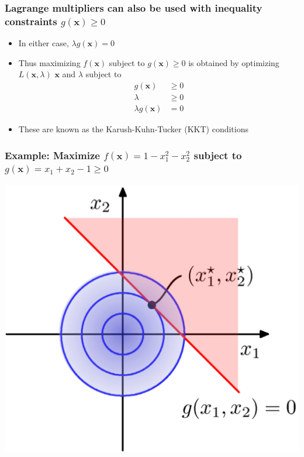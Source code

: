 \documentclass[12pt,notes,mathserif]{beamer}
\begin{document}
\begin{frame}[c]
	\frametitle{Lagrange multipliers can also be used with inequality constraints $g(\mathbf{x})\geqslant{}0$}
	\begin{itemize}
		\item In either case, $\lambda g(\mathbf{x})=0$
		\item Thus maximizing $f(\mathbf{x})$ subject to $g(\mathbf{x})\geqslant{}0$ is obtained by optimizing $L(\mathbf{x},\lambda)$ \wrt $\mathbf{x}$ and $\lambda$ subject to
		      \[
			      \begin{array}{cc}
				      g(\mathbf{x})         & \geqslant{}0 \\
				      \lambda               & \geqslant{}0 \\
				      \lambda g(\mathbf{x}) & =0
			      \end{array}
		      \]
		\item These are known as the Karush-Kuhn-Tucker (KKT) conditions
	\end{itemize}
\end{frame}


\begin{frame}[c]
	\frametitle{Example: Maximize $f(\mathbf{x})=1-x_1^2-x_2^2$ subject to $g(\mathbf{x})=x_1+x_2-1\geqslant{}0$}
	\begin{center}
		\includegraphics[width=0.65\linewidth]{fig8/lec835.jpg}
	\end{center}
\end{frame}
\end{document}
